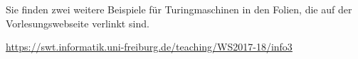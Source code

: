 
{
\color{red}
Sie finden zwei weitere Beispiele für Turingmaschinen in den Folien, die auf der Vorlesungswebseite verlinkt sind.

\url{https://swt.informatik.uni-freiburg.de/teaching/WS2017-18/info3}
}

